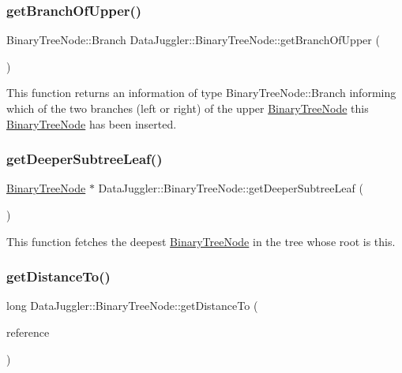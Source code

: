 \subsubsection{\texorpdfstring{get\+Branch\+Of\+Upper()}{getBranchOfUpper()}}
{\footnotesize\ttfamily Binary\+Tree\+Node\+::\+Branch Data\+Juggler\+::\+Binary\+Tree\+Node\+::get\+Branch\+Of\+Upper (\begin{DoxyParamCaption}{ }\end{DoxyParamCaption})}

This function returns an information of type Binary\+Tree\+Node\+::\+Branch informing which of the two branches (left or right) of the upper \hyperlink{classDataJuggler_1_1BinaryTreeNode}{Binary\+Tree\+Node} this \hyperlink{classDataJuggler_1_1BinaryTreeNode}{Binary\+Tree\+Node} has been inserted. \mbox{\label{classDataJuggler_1_1BinaryTreeNode_a7e0d717313cf4ca8fe28e9663dd2c299}} 
\subsubsection{\texorpdfstring{get\+Deeper\+Subtree\+Leaf()}{getDeeperSubtreeLeaf()}}
{\footnotesize\ttfamily \hyperlink{classDataJuggler_1_1BinaryTreeNode}{Binary\+Tree\+Node} $\ast$ Data\+Juggler\+::\+Binary\+Tree\+Node\+::get\+Deeper\+Subtree\+Leaf (\begin{DoxyParamCaption}{ }\end{DoxyParamCaption})}

This function fetches the deepest \hyperlink{classDataJuggler_1_1BinaryTreeNode}{Binary\+Tree\+Node} in the tree whose root is this. \mbox{\label{classDataJuggler_1_1BinaryTreeNode_a0ee7e550e37a7882e5bab3be3fac1a42}} 
\subsubsection{\texorpdfstring{get\+Distance\+To()}{getDistanceTo()}}
{\footnotesize\ttfamily long Data\+Juggler\+::\+Binary\+Tree\+Node\+::get\+Distance\+To (\begin{DoxyParamCaption}\item[{\hyperlink{classDataJuggler_1_1BinaryTreeNode}{Binary\+Tree\+Node} $\ast$}]{reference }\end{DoxyParamCaption})}

